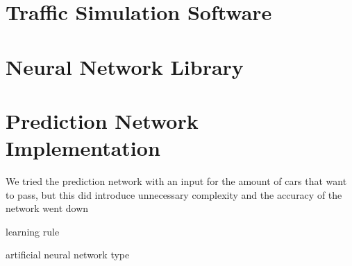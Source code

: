 \section{Traffic Simulation Software}



\section{Neural Network Library}


\section{Prediction Network Implementation}

We tried the prediction network with an input for the amount of cars that want to pass, but this did introduce unnecessary complexity and the accuracy of the network went down

learning rule

artificial neural network type